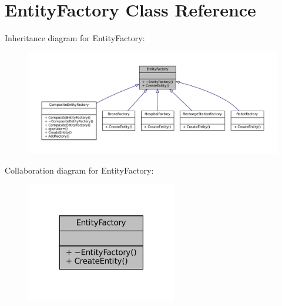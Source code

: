 \hypertarget{classEntityFactory}{}\section{Entity\+Factory Class Reference}
\label{classEntityFactory}


Inheritance diagram for Entity\+Factory\+:\nopagebreak
\begin{figure}[H]
\begin{center}
\leavevmode
\includegraphics[width=350pt]{classEntityFactory__inherit__graph}
\end{center}
\end{figure}


Collaboration diagram for Entity\+Factory\+:\nopagebreak
\begin{figure}[H]
\begin{center}
\leavevmode
\includegraphics[width=187pt]{classEntityFactory__coll__graph}
\end{center}
\end{figure}
